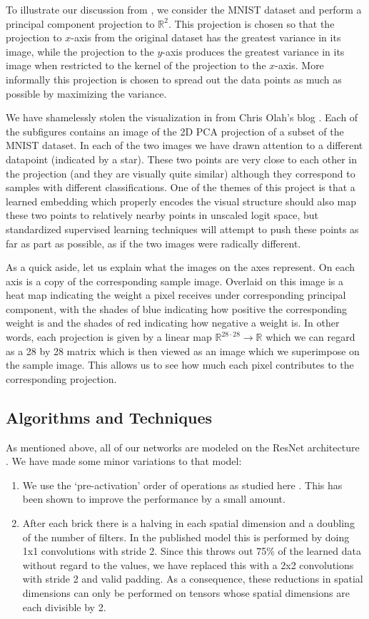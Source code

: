 \documentclass[english,a4paper,oneside]{amsart}
\theoremstyle{definition}
\begin{document}
To illustrate our discussion from , we consider the MNIST dataset and perform a principal component projection to $\mathbb{R}^2$. This projection is chosen so that the projection to $x$-axis  from the original dataset has the greatest variance in its image, while the projection to the $y$-axis produces the greatest variance in its image when restricted to the kernel of the projection to the $x$-axis. More informally this projection is chosen to spread out the data points as much as possible by maximizing the variance.

We have shamelessly stolen the visualization in  from Chris Olah's blog \cite{VisMNIST}. Each of the subfigures contains an image of the 2D PCA projection of a subset of the MNIST dataset. In each of the two images we have drawn attention to a different datapoint (indicated by a star). These two points are very close to each other in the projection (and they are visually quite similar) although they correspond to samples with different classifications.  One of the themes of this project is that a learned embedding which properly encodes the visual structure should also map these two points to relatively nearby points in unscaled logit space, but standardized supervised learning techniques will attempt to push these points as far as part as possible, as if the two images were radically different.

As a quick aside, let us explain what the images on the axes represent. On each axis is a copy of the corresponding sample image. Overlaid on this image is a heat map indicating the weight a pixel receives under corresponding principal component, with the shades of blue indicating how positive the corresponding weight is and the shades of red indicating how negative a weight is. In other words, each projection is given by a linear map $\mathbb{R}^{28\cdot 28}\to \mathbb{R}$ which we can regard as a 28 by 28 matrix which is then viewed as an image which we superimpose on the sample image. This allows us to see how much each pixel contributes to the corresponding projection.
\subsection{Algorithms and Techniques}
As mentioned above, all of our networks are modeled on the ResNet architecture \cite{ResNet}. We have made some minor variations to that model:
\begin{enumerate}
	\item We use the `pre-activation' order of operations as studied here \cite{Preactive}. This has been shown to improve the performance by a small amount.
	\item After each brick there is a halving in each spatial dimension and a doubling of the number of filters. In the published model this is performed by doing 1x1 convolutions with stride 2. Since this throws out 75\% of the learned data without regard to the values, we have replaced this with a 2x2 convolutions with stride 2 and valid padding. As a consequence, these reductions in spatial dimensions can only be performed on tensors  whose spatial dimensions are each divisible by 2.
\end{enumerate}
\end{document}
